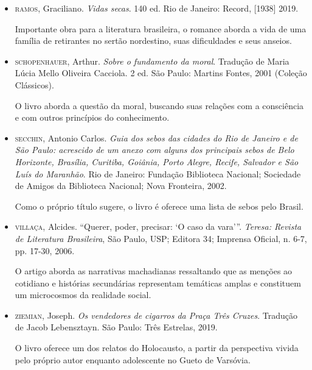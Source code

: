 \documentclass[11pt]{extarticle}
\begin{document}
\begin{itemize}
\item \textsc{ramos}, Graciliano. \emph{Vidas secas}. 140 ed. Rio de Janeiro: Record,
{[}1938{]} 2019.

Importante obra para a literatura brasileira, o romance aborda a vida de uma 
família de retirantes no sertão nordestino, suas dificuldades e seus anseios.

\item \textsc{schopenhauer}, Arthur. \emph{Sobre o fundamento da moral}. Tradução de
Maria Lúcia Mello Oliveira Cacciola. 2 ed. São Paulo: Martins Fontes,
2001 (Coleção Clássicos).

O livro aborda a questão da moral, buscando suas relações com a consciência e 
com outros princípios do conhecimento.

\item \textsc{secchin}, Antonio Carlos. \emph{Guia dos sebos das cidades do Rio de
Janeiro e de São Paulo: acrescido de um anexo com alguns dos principais
sebos de Belo Horizonte, Brasília, Curitiba, Goiânia, Porto Alegre,
Recife, Salvador e São Luís do Maranhão}. Rio de Janeiro: Fundação
Biblioteca Nacional; Sociedade de Amigos da Biblioteca Nacional; Nova
Fronteira, 2002.

Como o próprio título sugere, o livro é oferece uma lista de sebos pelo Brasil.

\item \textsc{villaça}, Alcides. ``Querer, poder, precisar: `O caso da vara'''.
\emph{Teresa: Revista de Literatura Brasileira}, São Paulo, USP; Editora
34; Imprensa Oficial, n. 6-7, pp. 17-30, 2006.

O artigo aborda as narrativas machadianas ressaltando que as menções ao cotidiano 
e histórias secundárias representam temáticas amplas e constituem um microcosmos 
da realidade social. 

\item \textsc{ziemian}, Joseph. \emph{Os vendedores de cigarros da Praça Três Cruzes}.
Tradução de Jacob Lebensztayn. São Paulo: Três Estrelas, 2019.

O livro oferece um dos relatos do Holocausto, a partir da perspectiva vivida pelo 
próprio autor enquanto adolescente no Gueto de Varsóvia.

\end{itemize}
	
\end{document}
